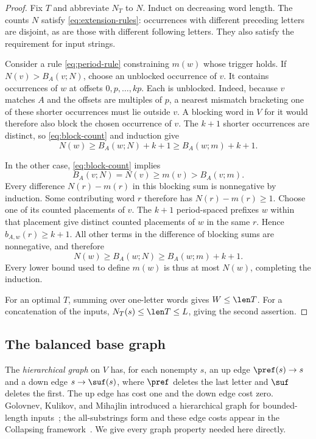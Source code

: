 \begin{proof}
Fix $T$ and abbreviate $N_T$ to $N$. Induct on decreasing word length. The counts $N$ satisfy \eqref{eq:extension-rules}: occurrences with different preceding letters are disjoint, as are those with different following letters. They also satisfy the requirement for input strings.

Consider a rule \eqref{eq:period-rule} constraining $m(w)$ whose trigger holds. If $N(v)>B_A(v;N)$, choose an unblocked occurrence of $v$. It contains occurrences of $w$ at offsets $0,p,\ldots,kp$. Each is unblocked. Indeed, because $v$ matches $A$ and the offsets are multiples of $p$, a nearest mismatch bracketing one of these shorter occurrences must lie outside $v$. A blocking word in $V$ for it would therefore also block the chosen occurrence of $v$. The $k+1$ shorter occurrences are distinct, so \eqref{eq:block-count} and induction give
\[
N(w)\ge B_A(w;N)+k+1\ge B_A(w;m)+k+1.
\]

In the other case, \eqref{eq:block-count} implies
\[
B_A(v;N)=N(v)\ge m(v)>B_A(v;m).
\]
Every difference $N(r)-m(r)$ in this blocking sum is nonnegative by induction. Some contributing word $r$ therefore has $N(r)-m(r)\ge1$. Choose one of its counted placements of $v$. The $k+1$ period-spaced prefixes $w$ within that placement give distinct counted placements of $w$ in the same $r$. Hence $b_{A,w}(r)\ge k+1$. All other terms in the difference of blocking sums are nonnegative, and therefore
\[
N(w)\ge B_A(w;N)\ge B_A(w;m)+k+1.
\]
Every lower bound used to define $m(w)$ is thus at most $N(w)$, completing the induction.

For an optimal $T$, summing over one-letter words gives $W\le\len T$. For a concatenation of the inputs, $N_T(s)\le\len T\le L$, giving the second assertion.
\end{proof}

\subsection{The balanced base graph}

The \emph{hierarchical graph} on $V$ has, for each nonempty $s$, an up edge $\pref(s)\to s$ and a down edge $s\to\suf(s)$, where $\pref$ deletes the last letter and $\suf$ deletes the first. The up edge has cost one and the down edge cost zero. Golovnev, Kulikov, and Mihajlin introduced a hierarchical graph for bounded-length inputs~\cite{golovnev2014}; the all-substrings form and these edge costs appear in the Collapsing framework~\cite[Section~2.2]{collapsing2020}. We give every graph property needed here directly.

